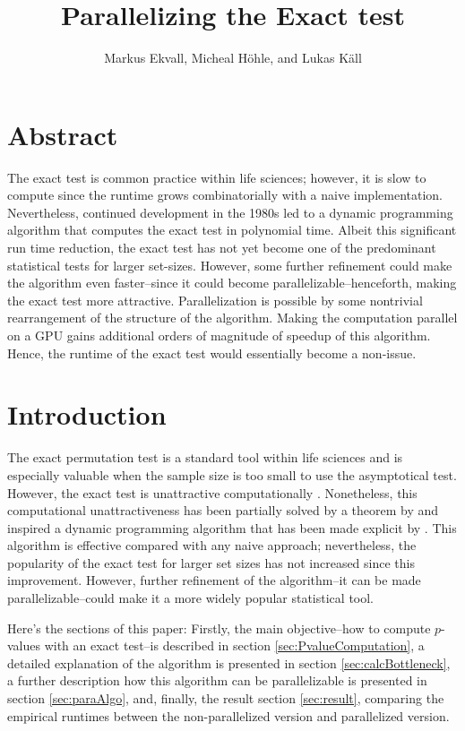 \documentclass[a4paper]{article}
\title{Parallelizing the Exact test}
\author{Markus Ekvall, Micheal Höhle, and Lukas Käll}
\begin{document}
\tableofcontents
\maketitle

\section{Abstract}
The exact test is common practice within life sciences; however, it is slow to compute since the runtime grows combinatorially with a naive implementation. Nevertheless, continued development in the 1980s  led to a dynamic programming algorithm that computes the exact test in polynomial time. Albeit this significant run time reduction, the exact test has not yet become one of the predominant statistical tests for larger set-sizes. However, some further refinement could make the algorithm even faster–since it could become parallelizable–henceforth, making the exact test more attractive. Parallelization is possible by some nontrivial rearrangement of the structure of the algorithm. Making the computation parallel on a GPU gains additional orders of magnitude of speedup of this algorithm. Hence, the runtime of the exact test would essentially become a non-issue.

\section{Introduction}
The exact permutation test is a standard tool within life sciences and is especially valuable when the sample size is too small to use the asymptotical test. However, the exact test is unattractive computationally \cite{segal2018fast}. Nonetheless, this computational unattractiveness has been partially solved by a theorem by \cite{pagano_trichtler1983} and inspired a dynamic programming algorithm that has been made explicit by \cite{zimmermann1985}. This algorithm is effective compared with any naive approach; nevertheless, the popularity of the exact test for larger set sizes has not increased since this improvement. However, further refinement of the algorithm–it can be made parallelizable–could make it a more widely popular statistical tool.

Here's the sections of this paper: Firstly, the main objective–how to compute $p$-values with an exact test–is described in section \ref{sec:PvalueComputation}, a detailed explanation of the algorithm is presented in section \ref{sec:calcBottleneck}, a further description how this algorithm can be parallelizable is presented in section \ref{sec:paraAlgo}, and, finally, the result section \ref{sec:result}, comparing the empirical runtimes between the non-parallelized version and parallelized version.
\end{document}
